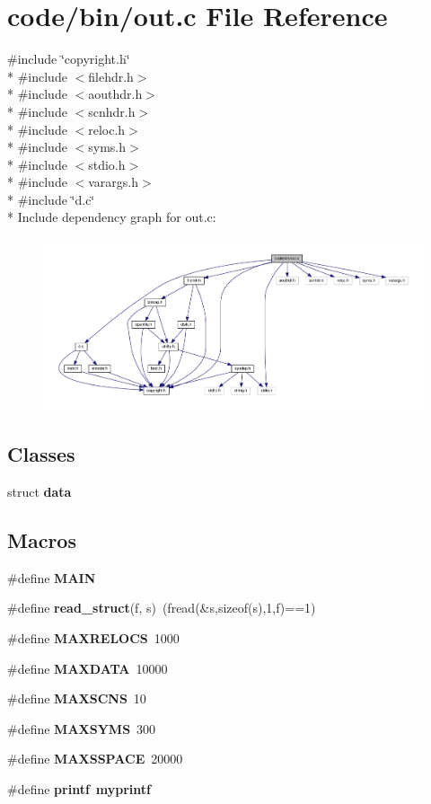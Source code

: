 \section{code/bin/out.c File Reference}
\label{out_8c}
{\ttfamily \#include \char`\"{}copyright.\+h\char`\"{}}\\*
{\ttfamily \#include $<$filehdr.\+h$>$}\\*
{\ttfamily \#include $<$aouthdr.\+h$>$}\\*
{\ttfamily \#include $<$scnhdr.\+h$>$}\\*
{\ttfamily \#include $<$reloc.\+h$>$}\\*
{\ttfamily \#include $<$syms.\+h$>$}\\*
{\ttfamily \#include $<$stdio.\+h$>$}\\*
{\ttfamily \#include $<$varargs.\+h$>$}\\*
{\ttfamily \#include \char`\"{}d.\+c\char`\"{}}\\*
Include dependency graph for out.\+c\+:
\nopagebreak
\begin{figure}[H]
\begin{center}
\leavevmode
\includegraphics[width=350pt]{out_8c__incl}
\end{center}
\end{figure}
\subsection*{Classes}
\begin{DoxyCompactItemize}
\item 
struct {\bf data}
\end{DoxyCompactItemize}
\subsection*{Macros}
\begin{DoxyCompactItemize}
\item 
\#define {\bf M\+A\+IN}
\item 
\#define {\bf read\+\_\+struct}(f,  s)~(fread(\&s,sizeof(s),1,f)==1)
\item 
\#define {\bf M\+A\+X\+R\+E\+L\+O\+CS}~1000
\item 
\#define {\bf M\+A\+X\+D\+A\+TA}~10000
\item 
\#define {\bf M\+A\+X\+S\+C\+NS}~10
\item 
\#define {\bf M\+A\+X\+S\+Y\+MS}~300
\item 
\#define {\bf M\+A\+X\+S\+S\+P\+A\+CE}~20000
\item 
\#define {\bf printf}~{\bf myprintf}
\end{DoxyCompactItemize}
